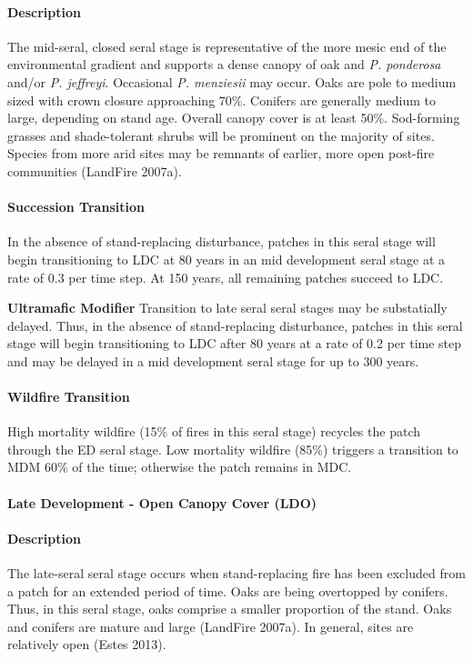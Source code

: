 \paragraph*{Description} The mid-seral, closed seral stage is representative of the more mesic end of the environmental gradient and supports a dense canopy of oak and \emph{P. ponderosa} and/or \emph{P. jeffreyi}. Occasional \emph{P. menziesii} may occur. Oaks are pole to medium sized with crown closure approaching 70\%. Conifers are generally medium to large, depending on stand age. Overall canopy cover is at least 50\%. Sod-forming grasses and shade-tolerant shrubs will be prominent on the majority of sites. Species from more arid sites may be remnants of earlier, more open post-fire communities (LandFire 2007a).

\paragraph*{Succession Transition} In the absence of stand-replacing disturbance, patches in this seral stage will begin transitioning to LDC at 80 years in an mid development seral stage at a rate of 0.3 per time step. At 150 years, all remaining patches succeed to LDC.
\begin{adjustwidth}{2cm}{}

\medskip
\textbf{Ultramafic Modifier}  Transition to late seral seral stages may be substatially delayed. Thus, in the absence of stand-replacing disturbance, patches in this seral stage will begin transitioning to LDC after 80 years at a rate of 0.2 per time step and may be delayed in a mid development seral stage for up to 300 years.

\end{adjustwidth}
\paragraph*{Wildfire Transition} High mortality wildfire (15\% of fires in this seral stage) recycles the patch through the ED seral stage. Low mortality wildfire (85\%) triggers a transition to MDM 60\% of the time; otherwise the patch remains in MDC.


\noindent\hrulefill


\paragraph*{Late Development - Open Canopy Cover (LDO)}

\paragraph*{Description} The late-seral seral stage occurs when stand-replacing fire has been excluded from a patch for an extended period of time. Oaks are being overtopped by conifers. Thus, in this seral stage, oaks comprise a smaller proportion of the stand. Oaks and conifers are mature and large (LandFire 2007a). In general, sites are relatively open (Estes 2013).

